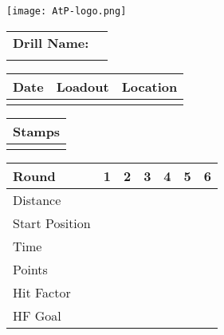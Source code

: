 \documentclass[../Cover.tex]{subfiles}
\begin{document}
	\begin{minipage}[t][0.15\textheight][t]{0.1\textwidth} 
		\texttt{[image: AtP-logo.png]}
	\end{minipage}
	\hfill
	\begin{minipage}[t][0.15\textheight][t]{0.8\textwidth}
		\begin{tabular}{ p{} l  }
			\\		
			\textbf{Drill Name:} \\
			\\[0.03\textheight]
			\hline
		\end{tabular}
		\quad
		\small \begin{tabular}{ | p{} | p{} | p{} |}
			\hline
			\rowcolor[HTML]{C0C0C0}Date & Loadout & Location\\ 
			\hline
			&  &  \\ 
			\hline
		\end{tabular}
	\end{minipage}
	
	\begin{tabular}{p{}|}
		Stamps \\
		\hline
		\\[0.65\textheight]
	\end{tabular}
	\quad
	\begin{tabular}{ | p{} | p{} | p{} | p{} | p{} | p{} | p{} |}
		\hline
		\rowcolor[HTML]{C0C0C0}Round & 1 & 2 & 3 & 4 & 5 & 6 \\
		\hline
		\cellcolor[HTML]{C0C0C0}\tiny Distance & & & & & & \\[0.05\textheight]
		\hline
		\cellcolor[HTML]{C0C0C0}\tiny Start Position & & & & & & \\[0.05\textheight]
		\hline
		\cellcolor[HTML]{C0C0C0}\tiny Time & & & & & & \\[0.05\textheight]
		\hline
		\cellcolor[HTML]{C0C0C0}\tiny Points & & & & & & \\[0.05\textheight]
		\hline
		\cellcolor[HTML]{C0C0C0}\tiny Hit Factor & & & & & & \\[0.05\textheight]
		\hline
		\cellcolor[HTML]{C0C0C0}\tiny HF Goal & & & & & & \\[0.05\textheight]
		\hline
	\end{tabular}
\end{document}
